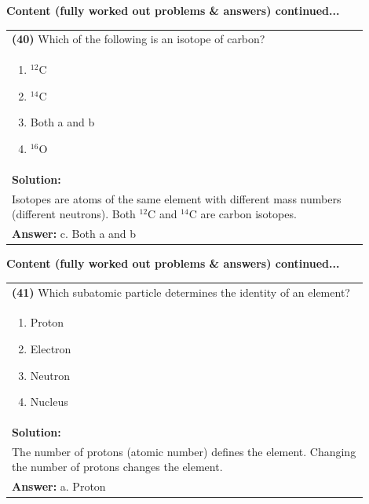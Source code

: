 \documentclass{article}
\begin{document}
\noindent
{\large\textbf{Content (fully worked out problems \& answers) continued...}}\\[0.2em]
\vspace{0.2cm}
\begin{tabular}{|p{0.9\linewidth}|}
\hline
\vspace{0.2cm}
\textbf{(40)} Which of the following is an isotope of carbon? \\
\begin{minipage}[t]{0.85\linewidth}
\begin{enumerate}[label=\alph*.]
\item $^{12}$C
\item $^{14}$C
\item Both a and b
\item $^{16}$O
\end{enumerate}
\end{minipage}\\
\hline
\vspace{0.2cm}
\textbf{Solution:} \\
Isotopes are atoms of the same element with different mass numbers (different neutrons). Both $^{12}$C and $^{14}$C are carbon isotopes. \\
\hline
\vspace{0.2cm}
\textbf{Answer:} c. Both a and b \\
\hline
\end{tabular}
\newpage

\noindent
{\large\textbf{Content (fully worked out problems \& answers) continued...}}\\[0.2em]
\vspace{0.2cm}
\begin{tabular}{|p{0.9\linewidth}|}
\hline
\vspace{0.2cm}
\textbf{(41)} Which subatomic particle determines the identity of an element? \\
\begin{minipage}[t]{0.85\linewidth}
\begin{enumerate}[label=\alph*.]
\item Proton
\item Electron
\item Neutron
\item Nucleus
\end{enumerate}
\end{minipage}\\
\hline
\vspace{0.2cm}
\textbf{Solution:} \\
The number of protons (atomic number) defines the element. Changing the number of protons changes the element. \\
\hline
\vspace{0.2cm}
\textbf{Answer:} a. Proton \\
\hline
\end{tabular}
\newpage
\end{document}
